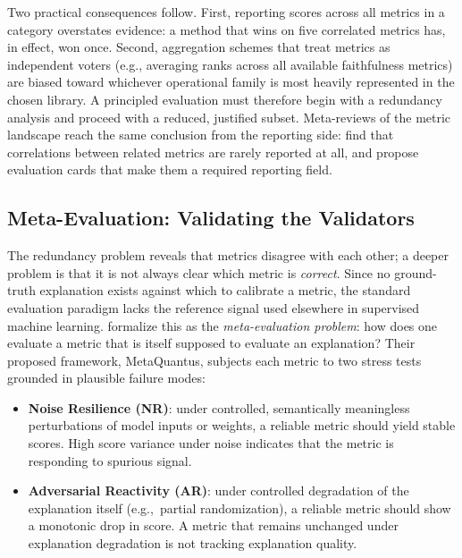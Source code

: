 Two practical consequences follow. First, reporting scores across all metrics
in a category overstates evidence: a method that wins on five correlated
metrics has, in effect, won once. Second, aggregation schemes that treat
metrics as independent voters (e.g., averaging ranks across all available
faithfulness metrics) are biased toward whichever operational family is most
heavily represented in the chosen library. A principled evaluation must
therefore begin with a redundancy analysis and proceed with a reduced,
justified subset. Meta-reviews of the metric landscape reach the same
conclusion from the reporting side: \citet{gipiskis2026cards} find that
correlations between related metrics are rarely reported at all, and propose
evaluation cards that make them a required reporting field.

\subsection{Meta-Evaluation: Validating the Validators}
\label{subsec:meta-evaluation}

The redundancy problem reveals that metrics disagree with each other; a deeper
problem is that it is not always clear which metric is \emph{correct}. Since
no ground-truth explanation exists against which to calibrate a metric, the
standard evaluation paradigm lacks the reference signal used elsewhere in
supervised machine learning. \citet{hedstrom2024metaquantus} formalize this as
the \emph{meta-evaluation problem}: how does one evaluate a metric that is
itself supposed to evaluate an explanation? Their proposed framework,
MetaQuantus, subjects each metric to two stress tests grounded in plausible
failure modes:

\begin{itemize}
    \item \textbf{Noise Resilience (NR)}: under controlled, semantically
    meaningless perturbations of model inputs or weights, a reliable metric
    should yield stable scores. High score variance under noise indicates
    that the metric is responding to spurious signal.
    \item \textbf{Adversarial Reactivity (AR)}: under controlled degradation
    of the explanation itself (e.g.,\ partial randomization), a reliable
    metric should show a monotonic drop in score. A metric that remains
    unchanged under explanation degradation is not tracking explanation
    quality.
\end{itemize}

